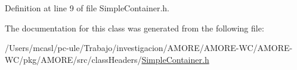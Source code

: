 Definition at line 9 of file SimpleContainer.h.



The documentation for this class was generated from the following file:\begin{DoxyCompactItemize}
\item 
/Users/mcasl/pc-\/ule/Trabajo/investigacion/AMORE/AMORE-\/WC/AMORE-\/WC/pkg/AMORE/src/classHeaders/\hyperlink{_simple_container_8h}{SimpleContainer.h}\end{DoxyCompactItemize}
